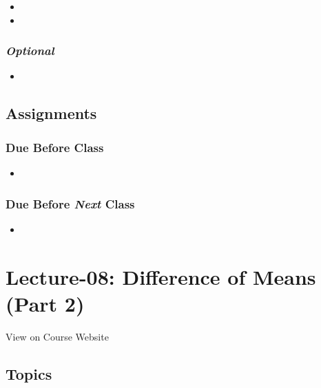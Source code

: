 \documentclass[]{book}
\theoremstyle{definition}
\theoremstyle{definition}
\theoremstyle{definition}
\theoremstyle{remark}
\begin{document}
\begin{itemize}
\item
\item
\end{itemize}

\subsubsection*{\texorpdfstring{\emph{Optional}}{Optional}}\label{optional-7}

\begin{itemize}
\item
\end{itemize}

\subsection*{Assignments}\label{assignments-8}

\subsubsection*{Due Before Class}\label{due-before-class-6}

\begin{itemize}
\item
\end{itemize}

\subsubsection*{\texorpdfstring{Due Before \emph{Next}
Class}{Due Before Next Class}}\label{due-before-next-class-7}

\begin{itemize}
\item
\end{itemize}

\section{Lecture-08: Difference of Means (Part
2)}\label{lecture-08-difference-of-means-part-2}

View on Course Website

\subsection*{Topics}\label{topics-8}
\end{document}
